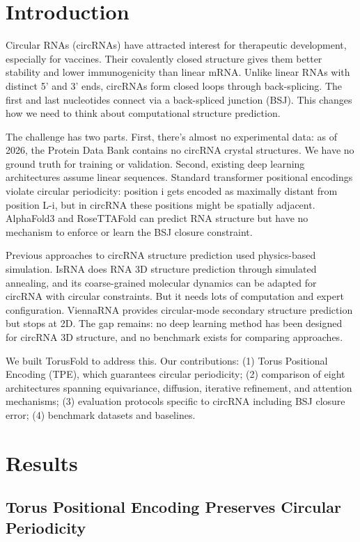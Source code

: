 \documentclass[12pt]{article}
\begin{document}
\section{Introduction}

Circular RNAs (circRNAs) have attracted interest for therapeutic development, especially for vaccines. Their covalently closed structure gives them better stability and lower immunogenicity than linear mRNA. Unlike linear RNAs with distinct 5' and 3' ends, circRNAs form closed loops through back-splicing. The first and last nucleotides connect via a back-spliced junction (BSJ). This changes how we need to think about computational structure prediction.

The challenge has two parts. First, there's almost no experimental data: as of 2026, the Protein Data Bank contains no circRNA crystal structures. We have no ground truth for training or validation. Second, existing deep learning architectures assume linear sequences. Standard transformer positional encodings violate circular periodicity: position i gets encoded as maximally distant from position L-i, but in circRNA these positions might be spatially adjacent. AlphaFold3 and RoseTTAFold can predict RNA structure but have no mechanism to enforce or learn the BSJ closure constraint.

Previous approaches to circRNA structure prediction used physics-based simulation. IsRNA does RNA 3D structure prediction through simulated annealing, and its coarse-grained molecular dynamics can be adapted for circRNA with circular constraints. But it needs lots of computation and expert configuration. ViennaRNA provides circular-mode secondary structure prediction but stops at 2D. The gap remains: no deep learning method has been designed for circRNA 3D structure, and no benchmark exists for comparing approaches.

We built TorusFold to address this. Our contributions: (1) Torus Positional Encoding (TPE), which guarantees circular periodicity; (2) comparison of eight architectures spanning equivariance, diffusion, iterative refinement, and attention mechanisms; (3) evaluation protocols specific to circRNA including BSJ closure error; (4) benchmark datasets and baselines.

\section{Results}

\subsection{Torus Positional Encoding Preserves Circular Periodicity}
\end{document}
